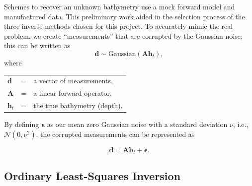 
Schemes to recover an unknown bathymetry use a mock forward model and manufactured data. This preliminary work aided in the selection process of the three inverse methods chosen for this project. %
To accurately mimic the real problem, we create ``measurements'' that are corrupted by the Gaussian noise; this can be written as 
\begin{equation}
\mathbf{d} \sim \text{Gaussian}( \mathbf{A} \mathbf{h}_t),
\end{equation}
\vspace{0.3cm}
where\\
\begin{tabular}{l c l}
$\mathbf{d}$ &=& a vector of measurements,\\
$\mathbf{A}$ &=& a linear forward operator,\\
$\mathbf{h}_t$ &=& the true bathymetry (depth). 
\end{tabular}

\vspace{0.3cm}
\noindent By defining $\boldsymbol{\epsilon}$ as our mean zero Gaussian noise with a standard deviation $\nu$, i.e., $\mathcal{N}(0, \nu^2)$, the corrupted measurements can be represented as

$$
\mathbf{d} = \mathbf{A} \mathbf{h}_t + \boldsymbol{\epsilon}.
$$



\subsection{Ordinary Least-Squares Inversion}


